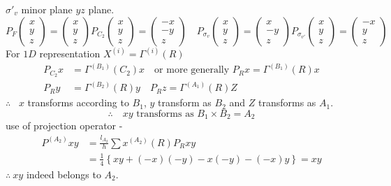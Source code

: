 $\sigma'_{v}$ minor plane $yz$ plane.
$$
P_{F}
\left(\begin{matrix}
x\\
y\\
z
\end{matrix}\right)
=
\left(\begin{matrix}
x\\
y\\
z
\end{matrix}\right)
P_{C_{2}}
\left(\begin{matrix}
x\\
y\\
z
\end{matrix}\right)
=
\left(\begin{matrix}
-x\\
-y\\
z
\end{matrix}\right)
\quad 
P_{\sigma_{v}}
\left(\begin{matrix}
x\\
y\\
z
\end{matrix}\right)
=
\left(\begin{matrix}
x\\
-y\\
z
\end{matrix}\right)
P_{\sigma_{v'}}
\left(\begin{matrix}
x\\
y\\
z
\end{matrix}\right)
=
\left(\begin{matrix}
-x\\
y\\
z
\end{matrix}\right)
$$
For $1D$ representation $X^{(i)}=\Gamma^{(i)}(R)$ 
\begin{align*}
P_{C_{2}}x &= \Gamma^{(B_{1})}(C_{2})x\quad \text{or more generally } P_{R}x=\Gamma^{(B_{1})}(R)x\\
P_{R}y &= \Gamma^{(B_{2})}(R)y\quad P_{R}z=\Gamma^{(A_{1})}(R)Z
\end{align*}
$\therefore$ \ $x$ transforms according to $B_{1}$, $y$ transform as $B_{2}$ and $Z$ transforms as $A_{1}$.
$$
\therefore\quad xy \text{ transforms as } B_{1}\times B_{2}=A_{2}
$$
use of projection operator -
\begin{align*}
P^{(A_{2})}xy &= \frac{l_{A_{2}}}{h}\sum x^{(A_{2})}(R)P_{R}xy\\
&= \frac{1}{4}\left\{xy+(-x)(-y)-x(-y)-(-x)y\right\}=xy
\end{align*}
$\therefore \ xy$ indeed belongs to $A_{2}$.

